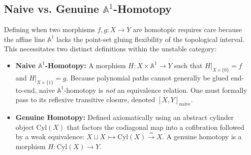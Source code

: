\documentclass[11pt,oneside]{article}
\begin{document}
\subsection{Naive vs. Genuine $\mathbb{A}^1$-Homotopy}
Defining when two morphisms $f,g: X \to Y$ are homotopic requires care because the affine line $\mathbb{A}^1$ lacks the point-set gluing flexibility of the topological interval. This necessitates two distinct definitions within the unstable category:
\begin{itemize}
    \item \textbf{Naive $\mathbb{A}^1$-Homotopy:} A morphism $H: X \times \mathbb{A}^1 \to Y$ such that $H|_{X \times \{0\}} = f$ and $H|_{X \times \{1\}} = g$. Because polynomial paths cannot generally be glued end-to-end, naive $\mathbb{A}^1$-homotopy is \emph{not} an equivalence relation. One must formally pass to its reflexive transitive closure, denoted $[X,Y]_{\text{naive}}$.
    \item \textbf{Genuine Homotopy:} Defined axiomatically using an abstract cylinder object $\text{Cyl}(X)$ that factors the codiagonal map into a cofibration followed by a weak equivalence: $X \sqcup X \rightarrowtail \text{Cyl}(X) \xrightarrow{\simeq} X$. A genuine homotopy is a morphism $H: \text{Cyl}(X) \to Y$. 
\end{itemize}
\end{document}
